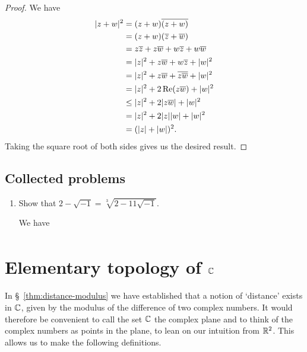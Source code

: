 \begin{proof}
    We have
    \[
        \begin{aligned}
            |z + w|^2 &= (z + w)\overline{(z + w)} \\
            &= (z + w)(\overline{z} + \overline{w}) \\
            &= z\overline{z} + z\overline{w} + w\overline{z} + w\overline{w} \\
            &= |z|^2 + z\overline{w} + w\overline{z} + |w|^2 \\
            &= |z|^2 + z\overline{w} + \overline{z\overline{w}} + |w|^2 \\
            &= |z|^2 + 2\operatorname{Re}(z\overline{w}) + |w|^2 \\
            &\leq |z|^2 + 2|z\overline{w}| + |w|^2 \\
            &= |z|^2 + 2|z||w| + |w|^2 \\
            &= (|z| + |w|)^2.
        \end{aligned}
    \]
    Taking the square root of both sides gives us the desired result.
\end{proof}

\begin{corollary}
    \label{cor:triangle-inequality}
    
\end{corollary}

\subsection*{Collected problems}

\begin{enumerate}
    \item Show that \(2 - \sqrt{-1} = \sqrt[3]{2 - 11 \sqrt{-1}}\).
    \begin{solution}
        We have
        \begin{align*}
        \end{align*}
    \end{solution}
\end{enumerate}

\section{Elementary topology of \(\mathbb{C}\)}

In \S~\ref{thm:distance-modulus} we have established that a notion of `distance' exists in \(\mathbb{C}\), given by the modulus of the difference of two complex numbers. It would therefore be convenient to call the set \(\mathbb{C}\) the complex plane and to think of the complex numbers as points in the plane, to lean on our intuition from \(\mathbb{R}^2\). This allows us to make the following definitions.

